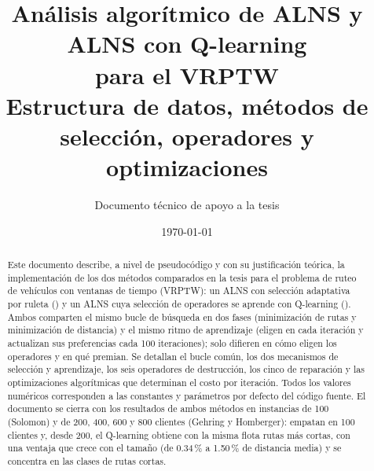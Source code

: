 \documentclass[11pt,a4paper]{article}
\title{Análisis algorítmico de ALNS y ALNS con Q-learning\\ para el VRPTW\\[4pt]
\large Estructura de datos, métodos de selección, operadores y optimizaciones}
\author{Documento técnico de apoyo a la tesis}
\date{\today}
\begin{document}
\maketitle

\begin{abstract}
\noindent Este documento describe, a nivel de pseudocódigo y con su justificación teórica, la
implementación de los dos métodos comparados en la tesis para el problema de ruteo de vehículos
con ventanas de tiempo (VRPTW): un ALNS con selección adaptativa por ruleta ()
y un ALNS cuya selección de operadores se aprende con Q-learning ().
Ambos comparten el mismo bucle de búsqueda en dos fases (minimización de rutas y minimización
de distancia) y el mismo ritmo de aprendizaje (eligen en cada iteración y actualizan sus
preferencias cada 100 iteraciones); solo difieren en cómo eligen los operadores y en qué
premian. Se detallan el bucle común, los dos mecanismos de selección y aprendizaje, los seis
operadores de destrucción, los cinco de reparación y las optimizaciones algorítmicas que
determinan el costo por iteración. Todos los valores numéricos corresponden a las constantes y
parámetros por defecto del código fuente. El documento se cierra con los resultados de ambos
métodos en instancias de 100 (Solomon) y de 200, 400, 600 y 800 clientes (Gehring y
Homberger): empatan en 100 clientes y, desde 200, el Q-learning obtiene con la misma flota
rutas más cortas, con una ventaja que crece con el tamaño (de 0.34\,\% a 1.50\,\% de distancia
media) y se concentra en las clases de rutas cortas.
\end{abstract}

\tableofcontents
\listofalgorithms
\clearpage











\end{document}

